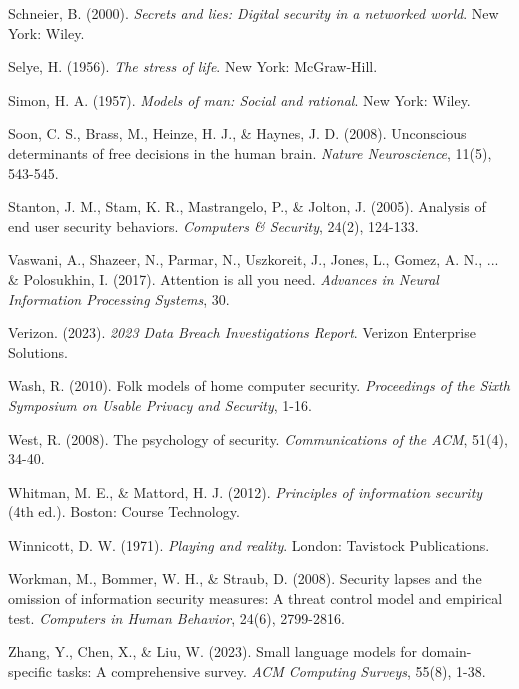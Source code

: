 \documentclass[11pt,a4paper]{article}
\begin{document}
\begin{thebibliography}{99}
Schneier, B. (2000). \textit{Secrets and lies: Digital security in a networked world}. New York: Wiley.

Selye, H. (1956). \textit{The stress of life}. New York: McGraw-Hill.

Simon, H. A. (1957). \textit{Models of man: Social and rational}. New York: Wiley.

Soon, C. S., Brass, M., Heinze, H. J., \& Haynes, J. D. (2008). Unconscious determinants of free decisions in the human brain. \textit{Nature Neuroscience}, 11(5), 543-545.

Stanton, J. M., Stam, K. R., Mastrangelo, P., \& Jolton, J. (2005). Analysis of end user security behaviors. \textit{Computers \& Security}, 24(2), 124-133.

Vaswani, A., Shazeer, N., Parmar, N., Uszkoreit, J., Jones, L., Gomez, A. N., ... \& Polosukhin, I. (2017). Attention is all you need. \textit{Advances in Neural Information Processing Systems}, 30.

Verizon. (2023). \textit{2023 Data Breach Investigations Report}. Verizon Enterprise Solutions.

Wash, R. (2010). Folk models of home computer security. \textit{Proceedings of the Sixth Symposium on Usable Privacy and Security}, 1-16.

West, R. (2008). The psychology of security. \textit{Communications of the ACM}, 51(4), 34-40.

Whitman, M. E., \& Mattord, H. J. (2012). \textit{Principles of information security} (4th ed.). Boston: Course Technology.

Winnicott, D. W. (1971). \textit{Playing and reality}. London: Tavistock Publications.

Workman, M., Bommer, W. H., \& Straub, D. (2008). Security lapses and the omission of information security measures: A threat control model and empirical test. \textit{Computers in Human Behavior}, 24(6), 2799-2816.

Zhang, Y., Chen, X., \& Liu, W. (2023). Small language models for domain-specific tasks: A comprehensive survey. \textit{ACM Computing Surveys}, 55(8), 1-38.

\end{thebibliography}
\end{document}

